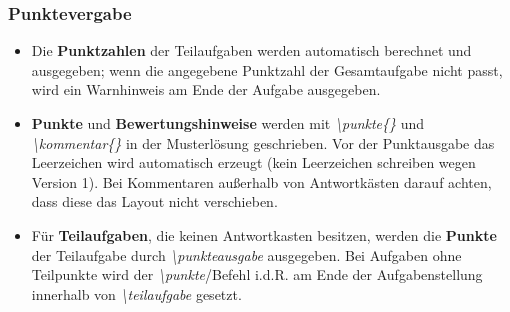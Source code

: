 \documentclass[./main.tex]{subfiles}
\begin{document}
\subsubsection{Punktevergabe}
\begin{itemize}
    \item Die \textbf{Punktzahlen} der Teilaufgaben werden automatisch berechnet und ausgegeben; wenn die angegebene Punktzahl der Gesamtaufgabe nicht passt, wird ein Warnhinweis am Ende der Aufgabe ausgegeben.
    \item \textbf{Punkte} und \textbf{Bewertungshinweise} werden mit \hypertarget{punkte}{\textit{\textbackslash punkte\{\}}} und \hypertarget{kommentar}{\textit{\textbackslash kommentar\{\}}} in der Musterl\"osung geschrieben. Vor der Punktausgabe das Leerzeichen wird automatisch erzeugt (kein Leerzeichen schreiben wegen Version 1). Bei Kommentaren au\ss{}erhalb von Antwortk\"asten darauf achten, dass diese das Layout nicht verschieben.
    \item F\"ur \textbf{Teilaufgaben}, die keinen Antwortkasten besitzen, werden die \textbf{Punkte} der Teilaufgabe durch \hypertarget{punkteausgabe}{\textit{\textbackslash punkteausgabe}} ausgegeben. Bei Aufgaben ohne Teilpunkte wird der \textit{\textbackslash punkte}\-/Befehl i.d.R. am Ende der Aufgabenstellung innerhalb von \textit{\textbackslash teilaufgabe} gesetzt.
\end{itemize}
\end{document}
